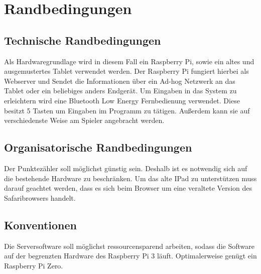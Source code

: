 \chapter{Randbedingungen}
\section{Technische Randbedingungen}
Als Hardwaregrundlage wird in diesem Fall ein Raspberry Pi, sowie ein altes und ausgemustertes Tablet verwendet werden. Der Raspberry Pi fungiert hierbei als Webserver und Sendet die Informationen über ein Ad-hog Netzwerk an das Tablet oder ein beliebiges anders Endgerät. Um Eingaben in das System zu erleichtern wird eine Bluetooth Low Energy Fernbedienung verwendet. Diese besitzt 5 Tasten um Eingaben im Programm zu tätigen. Außerdem kann sie auf verschiedenste Weise am Spieler angebracht werden.
\section{Organisatorische Randbedingungen}
Der Punktezähler soll möglichst günstig sein. Deshalb ist es notwendig sich auf die bestehende Hardware zu beschränken. Um das alte IPad zu unterstützen muss darauf geachtet werden, dass es sich beim Browser um eine veraltete Version des Safaribrowsers handelt.
\section{Konventionen}
Die Serversoftware soll möglichst ressourcensparend arbeiten, sodass die Software auf der begrenzten Hardware des Raspberry Pi 3 läuft. Optimalerweise genügt ein Raspberry Pi Zero.